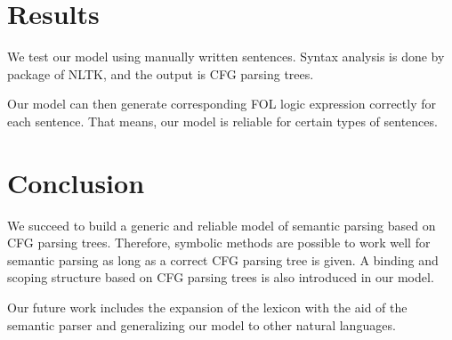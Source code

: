 \documentclass{article}
\begin{document}

\section{Results}{
	We test our model using manually written sentences. Syntax analysis is done by package of NLTK, and the output is CFG parsing trees. 

	Our model can then generate corresponding FOL logic expression correctly for each sentence. That means, our model is reliable for certain types of sentences. 
}

\section{Conclusion}{
	We succeed to build a generic and reliable model of semantic parsing based on CFG parsing trees. Therefore, symbolic methods are possible to work well for semantic parsing as long as a correct CFG parsing tree is given. A binding and scoping structure based on CFG parsing trees is also introduced in our model. 

	Our future work includes the expansion of the lexicon with the aid of the semantic parser and generalizing our model to other natural languages. 
}



\citation
\end{document}
